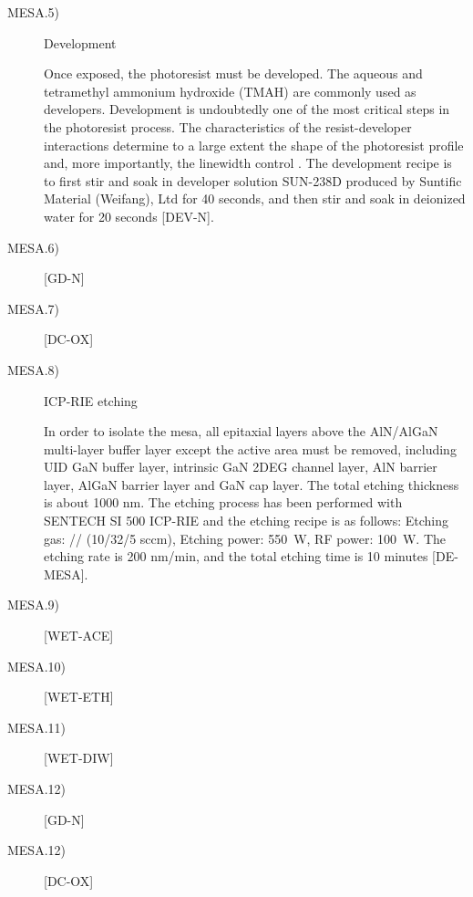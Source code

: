 \begin{description}
	\item[MESA.5)] Development
	
	Once  exposed, the photoresist  must be developed. The aqueous and tetramethyl ammonium hydroxide (TMAH) are commonly used as developers. Development is undoubtedly one of the most critical steps in the photoresist process. The characteristics of the resist-developer interactions determine to a large extent the shape of the photoresist profile and, more importantly, the linewidth control \cite{mack2008fundamental}. The development recipe is to first stir and soak in developer solution  SUN-238D produced by Suntific Material (Weifang), Ltd for 40 seconds, and then stir and soak in  deionized water for 20 seconds [DEV-N].	
	
	\item[MESA.6)] [GD-N]
	
	\item[MESA.7)] [DC-OX]
	
	\item[MESA.8)] ICP-RIE etching
	 
	 In  order  to isolate the  mesa, all epitaxial layers above the AlN/AlGaN multi-layer buffer layer except the active area  must be removed, including UID GaN buffer layer, intrinsic GaN 2DEG  channel  layer, AlN barrier layer, AlGaN barrier layer and GaN cap layer. The total etching thickness is about 1000 \unit{\nm}. The etching process has been performed with SENTECH SI 500 ICP-RIE  and the etching recipe is as follows: Etching gas: // (10/32/5 sccm), Etching power: \SI{550}{\watt}, RF power: \SI{100}{\watt}. The etching rate is 200 \unit{nm/min}, and the total etching time is 10 minutes [DE-MESA].
	 
	\item[MESA.9)] [WET-ACE]
	
	\item[MESA.10)] [WET-ETH]
	
	\item[MESA.11)] [WET-DIW]
	
	\item[MESA.12)] [GD-N]
	
	\item[MESA.12)] [DC-OX]
		
\end{description}


